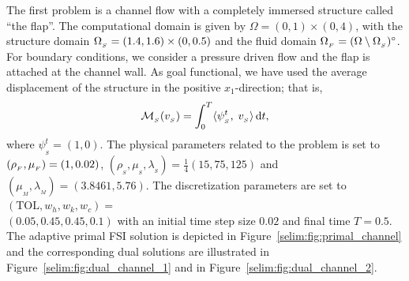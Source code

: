 The first problem is a channel flow with a completely immersed
structure called ``the flap''. The computational domain is given by
$\Omega = (0, 1)\times (0,4)$, with the structure domain $\Omega_{_{S}} = (1.4,
1.6)\times (0, 0.5)$ and the fluid domain $\Omega_{_{F}} = (\Omega\setminus
\Omega_{_{S}})^{\circ}$. For boundary conditions, we consider a pressure driven
flow and the flap is attached at the channel wall. As goal functional,
we have used the average displacement of the structure in the positive
$x_1$-direction; that is,
\begin{equation}
\label{selim:eq:goalfunctional_channel}
\mathcal{M}_{_{S}}(v_{_{S}}) = \int_0^T \langle \psi^t_{_{S}},\;
v_{_{S}}\rangle \, \mathrm{d}t,
\end{equation}
where $\psi^t_{_{S}} = (1,0)$. The physical parameters related to the
problem is set to $(\rho_{_{F}},\mu_{_{F}}) = (1, 0.02)$,
$(\rho_{_{S}},\mu_{_{S}}, \lambda_{_{S}}) = \tfrac{1}{4}(15, 75, 125)$
and $(\mu_{_{M}}, \lambda_{_{M}}) = (3.8461, 5.76)$. The
discretization parameters are set to $(\mathrm{TOL}, w_h, w_k,w_c) =$\\
$(0.05, 0.45, 0.45, 0.1)$ with an initial time step size $0.02$ and
final time $T=0.5$. The
adaptive primal FSI solution is depicted in
Figure~\ref{selim:fig:primal_channel} and the corresponding dual
solutions are illustrated in Figure~\ref{selim:fig:dual_channel_1}
and in Figure~\ref{selim:fig:dual_channel_2}.

